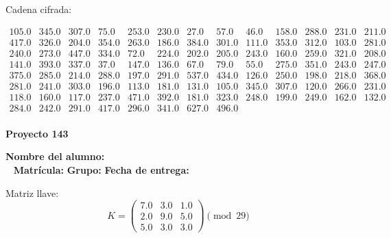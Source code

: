 \documentclass[12pt]{article}
\begin{document}
Cadena cifrada:
\begin{center}
$\begin{array}{lllllllllllll}
105.0 & 345.0 & 307.0 & 75.0 & 253.0 & 230.0 & 27.0 & 57.0 & 46.0 & 158.0 & 288.0 & 231.0 & 211.0\\
417.0 & 326.0 & 204.0 & 354.0 & 263.0 & 186.0 & 384.0 & 301.0 & 111.0 & 353.0 & 312.0 & 103.0 & 281.0\\
240.0 & 273.0 & 447.0 & 334.0 & 72.0 & 224.0 & 202.0 & 205.0 & 243.0 & 160.0 & 259.0 & 321.0 & 208.0\\
141.0 & 393.0 & 337.0 & 37.0 & 147.0 & 136.0 & 67.0 & 79.0 & 55.0 & 275.0 & 351.0 & 243.0 & 247.0\\
375.0 & 285.0 & 214.0 & 288.0 & 197.0 & 291.0 & 537.0 & 434.0 & 126.0 & 250.0 & 198.0 & 218.0 & 368.0\\
281.0 & 241.0 & 303.0 & 196.0 & 113.0 & 181.0 & 131.0 & 105.0 & 345.0 & 307.0 & 120.0 & 266.0 & 231.0\\
118.0 & 160.0 & 117.0 & 237.0 & 471.0 & 392.0 & 181.0 & 323.0 & 248.0 & 199.0 & 249.0 & 162.0 & 132.0\\
284.0 & 242.0 & 291.0 & 417.0 & 296.0 & 341.0 & 627.0 & 496.0\\
\end{array}$
\end{center}

\newpage


\textbf{Proyecto 143}

\textbf{Nombre del alumno:} \underline{\hspace{13cm}}\\\
\vspace{1cm}
\textbf{Matrícula:} \underline{\hspace{4cm}} \hspace{1cm}
\textbf{Grupo:} \underline{\hspace{2cm}}
\textbf{Fecha de entrega:} \underline{\hspace{2cm}}

\medskip

Matriz llave:
\[
K = \begin{pmatrix}
7.0 & 3.0 & 1.0\\
2.0 & 9.0 & 5.0\\
5.0 & 3.0 & 3.0
\end{pmatrix} \pmod{29}
\]
\end{document}
